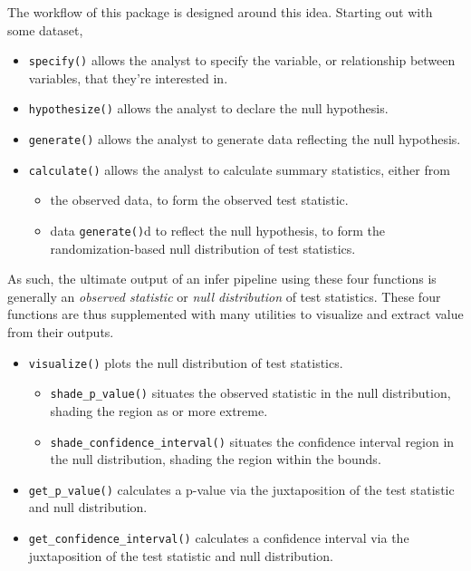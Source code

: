 \documentclass[10pt,a4paper,onecolumn]{article}
\providecommand{\tightlist}{%
  \setlength{\itemsep}{0pt}\setlength{\parskip}{0pt}}
\begin{document}
The workflow of this package is designed around this idea. Starting out
with some dataset,

\begin{itemize}
\tightlist
\item
  \texttt{specify()} allows the analyst to specify the variable, or
  relationship between variables, that they're interested in.
\item
  \texttt{hypothesize()} allows the analyst to declare the null
  hypothesis.
\item
  \texttt{generate()} allows the analyst to generate data reflecting the
  null hypothesis.
\item
  \texttt{calculate()} allows the analyst to calculate summary
  statistics, either from

  \begin{itemize}
  \tightlist
  \item
    the observed data, to form the observed test statistic.
  \item
    data \texttt{generate()}d to reflect the null hypothesis, to form
    the randomization-based null distribution of test statistics.
  \end{itemize}
\end{itemize}

As such, the ultimate output of an infer pipeline using these four
functions is generally an \emph{observed statistic} or \emph{null
distribution} of test statistics. These four functions are thus
supplemented with many utilities to visualize and extract value from
their outputs.

\begin{itemize}
\tightlist
\item
  \texttt{visualize()} plots the null distribution of test statistics.

  \begin{itemize}
  \tightlist
  \item
    \texttt{shade\_p\_value()} situates the observed statistic in the
    null distribution, shading the region as or more extreme.
  \item
    \texttt{shade\_confidence\_interval()} situates the confidence
    interval region in the null distribution, shading the region within
    the bounds.
  \end{itemize}
\item
  \texttt{get\_p\_value()} calculates a p-value via the juxtaposition of
  the test statistic and null distribution.
\item
  \texttt{get\_confidence\_interval()} calculates a confidence interval
  via the juxtaposition of the test statistic and null distribution.
\end{itemize}
\end{document}
